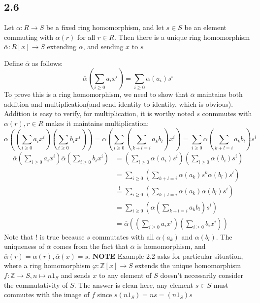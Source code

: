 \documentclass[a4paper, pdf, 12pt]{article}
\makeatletter
\renewenvironment{proof}[1][\proofname]{\par
  \pushQED{\qed}%
  \normalfont \topsep6\p@\@plus6\p@\relax
  \trivlist
  \item[%
    \hskip\labelsep
    \normalfont\bfseries %
    #1%
    \@addpunct{.}%
  ]\ignorespaces
}{%
  \popQED\endtrivlist\@endpefalse
}
\let\qed\relax %
\DeclareRobustCommand{\qed}{%
  \ifmmode \mathqed
  \else
    \leavevmode\unskip\penalty\@M\hbox{}\nobreak\hspace{.5em minus .1em}%
    \hbox{\qedsymbol}%
  \fi
}
\makeatother
\begin{document}
\subsection*{2.6}
Let $\alpha: R \rightarrow S$ be a ﬁxed ring homomorphism, and let 
$s \in S$ be an element commuting with $\alpha(r)$ for all $r \in R$. Then there is a unique ring 
homomorphism $\overline{\alpha}: R[x] \rightarrow S$ extending $\alpha$, and sending $x$ to $s$
\begin{proof}
  Define $\overline{\alpha}$ as follows:
  $$
  \overline{\alpha}(\sum_{i\geq 0} a_ix^{i}) = \sum_{i\geq 0}\alpha(a_i)s^{i}
  $$
  To prove this is a ring homomorphism, we need to show that $\overline{\alpha}$ maintains both addition and
  multiplication(and send identity to identity, which is obvious). Addition is easy to verify, for multiplication, 
  it is worthy noted $s$ conmmutes with $\alpha(r), r\in R$ makes it maintains multiplication:
  $$
  \overline{\alpha}((\sum_{i\geq 0}a_i x^i)(\sum_{i\geq 0}b_i x^{i}))=\overline{\alpha}(\sum_{i\geq 0}(\sum_{k+l=i}a_kb_l)x^{i})=\sum_{i\geq 0}\alpha(\sum_{k+l=i}a_kb_l)s^{i}
  $$
  $$
  \begin{aligned}
  \overline{\alpha}(\sum_{i\geq 0}a_ix^{i})\overline{\alpha}(\sum_{i\geq 0}b_ix^{i})&=(\sum_{i\geq 0}\alpha(a_i)s^{i})(\sum_{i\geq 0}\alpha(b_i)s^{i})\\
  &=\sum_{i\geq 0}(\sum_{k+l=i}\alpha(a_k)s^{k}\alpha(b_l)s^{l})\\
  &\stackrel{!}{=}\sum_{i\geq 0}(\sum_{k+l=i}\alpha(a_k)\alpha(b_l)s^{i})\\
  &=\sum_{i\geq 0}(\alpha(\sum_{k+l=i}a_kb_l)s^{i})\\
  &=\overline{\alpha}((\sum_{i\geq 0}a_ix^{i})(\sum_{i\geq 0}b_ix^{i}))
  \end{aligned}
  $$
  Note that $!$ is true because $s$ commutates with all $\alpha(a_k)$ and $\alpha(b_l)$.
  The uniqueness of $\overline{\alpha}$ comes from the fact that $\overline{\alpha}$ is homomorphism, and $\overline{\alpha}(r) = \alpha(r), \overline{\alpha}(x)=s$.
\end{proof}
\noindent
\textbf{NOTE} Example 2.2 asks for particular situation, where a ring homomorphism $\varphi: \mathbb{Z}[x]\rightarrow S$ extends the unique homomorphism 
$f:\mathbb{Z}\rightarrow S, n\mapsto n1_{S}$ and sends $x$ to any element of $S$ doesn't 
necessarily consider the commutativity of $S$. The answer is clean here, any element $s\in S$ must commutes with the image 
of $f$ since $s(n1_{S}) = ns = (n1_{S})s$
\end{document}
